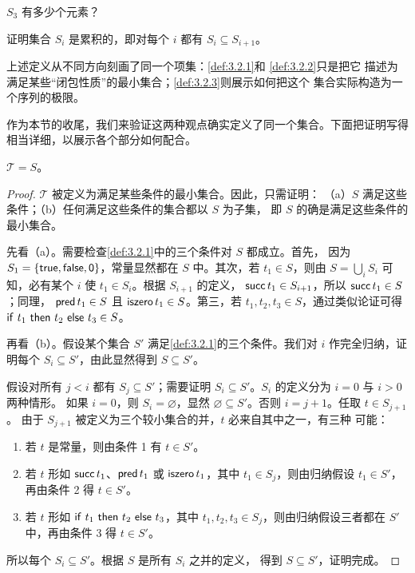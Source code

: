 \begin{exercise}[\(\star\star\)]
\label{ex:3.2.4}
\(S_3\) 有多少个元素？
\end{exercise}

\begin{exercise}[\(\star\star\)]
\label{ex:3.2.5}
证明集合 \(S_i\) 是累积的，即对每个 \(i\) 都有 \(S_i\subseteq S_{i+1}\)。
\end{exercise}

上述定义从不同方向刻画了同一个项集：\cref{def:3.2.1}和
\cref{def:3.2.2}只是把它
描述为满足某些“闭包性质”的最小集合；\cref{def:3.2.3}则展示如何把这个
集合实际构造为一个序列的极限。

作为本节的收尾，我们来验证这两种观点确实定义了同一个集合。下面把证明写得
相当详细，以展示各个部分如何配合。

\begin{proposition}
\label{prop:3.2.6}
\(\mathcal{T}=S\)。
\end{proposition}

\begin{proof}
\(\mathcal{T}\) 被定义为满足某些条件的最小集合。因此，只需证明：
（a）\(S\) 满足这些条件；（b）任何满足这些条件的集合都以 \(S\) 为子集，
即 \(S\) 的确是满足这些条件的最小集合。

先看（a）。需要检查\cref{def:3.2.1}中的三个条件对 \(S\) 都成立。首先，
因为 \(S_1=\{\mathsf{true},\mathsf{false},\mathsf{0}\}\)，常量显然都在 \(S\)
中。其次，若 \(t_1\in S\)，则由 \(S=\bigcup_i S_i\) 可知，必有某个
\(i\) 使 \(t_1\in S_i\)。根据 \(S_{i+1}\) 的定义，
\(\mathsf{succ}\,t_1\in S_{i+1}\)，所以 \(\mathsf{succ}\,t_1\in S\)；同理，
\(\mathsf{pred}\,t_1\in S\) 且 \(\mathsf{iszero}\,t_1\in S\)。第三，若
\(t_1,t_2,t_3\in S\)，通过类似论证可得
\(\mathsf{if}\ t_1\ \mathsf{then}\ t_2\ \mathsf{else}\ t_3\in S\)。

再看（b）。假设某个集合 \(S'\) 满足\cref{def:3.2.1}的三个条件。我们对
\(i\) 作完全归纳，证明每个 \(S_i\subseteq S'\)，由此显然得到
\(S\subseteq S'\)。

假设对所有 \(j<i\) 都有 \(S_j\subseteq S'\)；需要证明
\(S_i\subseteq S'\)。\(S_i\) 的定义分为 \(i=0\) 与 \(i>0\) 两种情形。
如果 \(i=0\)，则 \(S_i=\varnothing\)，显然
\(\varnothing\subseteq S'\)。否则 \(i=j+1\)。任取 \(t\in S_{j+1}\)。
由于 \(S_{j+1}\) 被定义为三个较小集合的并，\(t\) 必来自其中之一，有三种
可能：
\begin{enumerate}
  \item 若 \(t\) 是常量，则由条件 1 有 \(t\in S'\)。
  \item 若 \(t\) 形如 \(\mathsf{succ}\,t_1\)、\(\mathsf{pred}\,t_1\) 或
    \(\mathsf{iszero}\,t_1\)，其中 \(t_1\in S_j\)，则由归纳假设
    \(t_1\in S'\)，再由条件 2 得 \(t\in S'\)。
  \item 若 \(t\) 形如 \(\mathsf{if}\ t_1\ \mathsf{then}\ t_2\ \mathsf{else}\ t_3\)，其中
    \(t_1,t_2,t_3\in S_j\)，则由归纳假设三者都在 \(S'\) 中，再由条件 3
    得 \(t\in S'\)。
\end{enumerate}
所以每个 \(S_i\subseteq S'\)。根据 \(S\) 是所有 \(S_i\) 之并的定义，
得到 \(S\subseteq S'\)，证明完成。
\end{proof}

